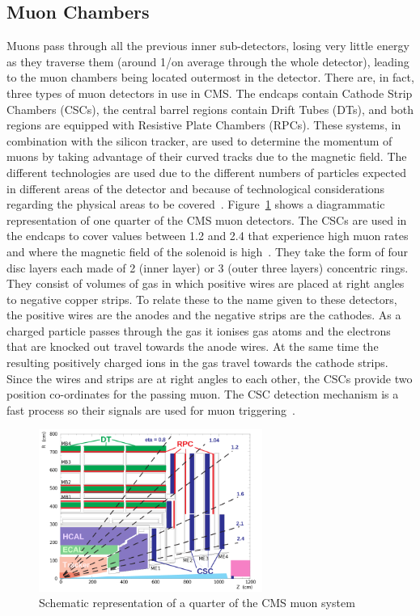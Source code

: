 \subsection{Muon Chambers}
\label{ss:Muon_Chambers}
Muons pass through all the previous inner sub-detectors, losing very little energy as they traverse them
(around 1\MeV/\mm on average through the whole detector), leading to the muon chambers being located outermost
in the detector. There are, in fact, three types of muon detectors in use in CMS. The endcaps contain Cathode
Strip Chambers (CSCs), the central barrel regions contain Drift Tubes (DTs), and both regions are equipped
with Resistive Plate Chambers (RPCs). These systems, in combination with the silicon tracker, are used to
determine the momentum of muons by taking advantage of their curved tracks due to the magnetic field. The
different technologies are used due to the different numbers of particles expected in different areas of the
detector and because of technological considerations regarding the physical areas to be
covered~\cite{CMS_TDR1}. Figure~\ref{fig:CMS_muon_system} shows a diagrammatic representation of one quarter
of the CMS muon detectors. The CSCs are used in the endcaps to cover \abseta values between 1.2 and 2.4 that
experience high muon rates and where the magnetic field of the solenoid is high~\cite{CMS_TDR1}. They take the
form of four disc layers each made of 2 (inner layer) or 3 (outer three layers) concentric rings. They consist
of volumes of gas in which positive wires are placed at right angles to negative copper strips. To relate
these to the name given to these detectors, the positive wires are the anodes and the negative strips are the
cathodes. As a charged particle passes through the gas it ionises gas atoms and the electrons that are knocked
out travel towards the anode wires. At the same time the resulting positively charged ions in the gas travel
towards the cathode strips. Since the wires and strips are at right angles to each other, the CSCs provide two
position co-ordinates for the passing muon. The CSC detection mechanism is a fast process so their signals are
used for muon triggering~\cite{CMS_experiment}.
 
\begin{figure}[hbtp]
   \centering
     \includegraphics[width=0.65\textwidth]{Chapters/04_Detector/Images/MuonSys-mod3.png}\hfill
     \caption[Schematic representation of a quarter of the CMS muon system.]{Schematic representation of a
     quarter of the CMS muon system \cite{Muon_tracking}}
     \label{fig:CMS_muon_system}
\end{figure}

